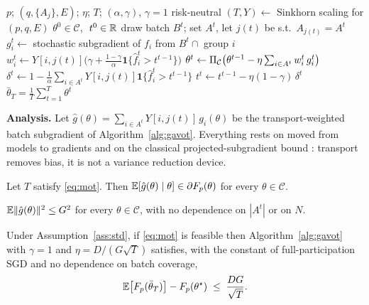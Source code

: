 \begin{algorithm}[t]
\caption{\avot{}: group-fair SGD by masked transport}
\label{alg:gavot}
\begin{algorithmic}[1]
\Require $p$; $(q,\{A_j\},E)$; $\eta$; $T$; $(\alpha,\gamma)$, $\gamma=1$ risk-neutral
\State $(T,Y)\leftarrow$ Sinkhorn scaling for $(p,q,E)$ 
\State $\theta^0\in\mathcal{C}$, $\ t^0\in\mathbb{R}$
  \State draw batch $B^t$; set $A^t$, let $j(t)$ be s.t.\ $A_{j(t)}=A^t$
  \State $g^t_i \leftarrow$ stochastic subgradient of $f_i$ from $B^t\cap$ group $i$
  \State $w^t_i \leftarrow Y[i,j(t)]\big(\gamma+\tfrac{1-\gamma}{\alpha}\mathbf{1}\{\hat f^t_i>t^{t-1}\}\big)$
  \State $\theta^{t}\leftarrow\Pi_{\mathcal{C}}\big(\theta^{t-1}-\eta\sum_{i\in A^t}w^t_i\,g^t_i\big)$
  \State $\delta^t\leftarrow 1-\tfrac{1}{\alpha}\sum_{i\in A^t}Y[i,j(t)]\mathbf{1}\{\hat f^t_i>t^{t-1}\}$
  \State $t^{t}\leftarrow t^{t-1}-\eta(1-\gamma)\,\delta^t$
\EndFor
\Ensure $\bar\theta_T=\frac{1}{T}\sum_{t=1}^{T}\theta^t$
\end{algorithmic}
\end{algorithm}

\noindent\textbf{Analysis.}
Let $\hat g(\theta)=\sum_{i\in A^t}Y[i,j(t)]\,g_i(\theta)$ be the
transport-weighted batch subgradient of Algorithm~\ref{alg:gavot}. Everything
rests on \cite[Lem.~1]{rahimi2025fedavot} moved from models to gradients and
on the classical projected-subgradient bound \cite{nemirovski2009}:
transport removes bias, it is not a variance reduction device.

\begin{lemma}[Unbiasedness]
\label{lem:unbiased}
Let $T$ satisfy \eqref{eq:mot}. Then $\mathbb{E}[\hat g(\theta)\mid\theta]\in\partial F_p(\theta)$
for every $\theta\in\mathcal{C}$.
\end{lemma}

\begin{lemma}
\label{lem:variance}
$\mathbb{E}\|\hat g(\theta)\|^2\le G^2$ for every $\theta\in\mathcal{C}$, with no
dependence on $|A^t|$ or on $N$.
\end{lemma}

\begin{theorem}[Rate]
\label{thm:rate}
Under Assumption~\ref{ass:std}, if \eqref{eq:mot} is feasible then
Algorithm~\ref{alg:gavot} with $\gamma=1$ and $\eta=D/(G\sqrt{T})$ satisfies,
with the constant of full-participation SGD and no dependence on batch
coverage,
\begin{equation}
\mathbb{E}\big[F_p(\bar\theta_T)\big]-F_p(\theta^\star)\;\le\;\frac{DG}{\sqrt{T}} .
\label{eq:rate}
\end{equation}
\end{theorem}

